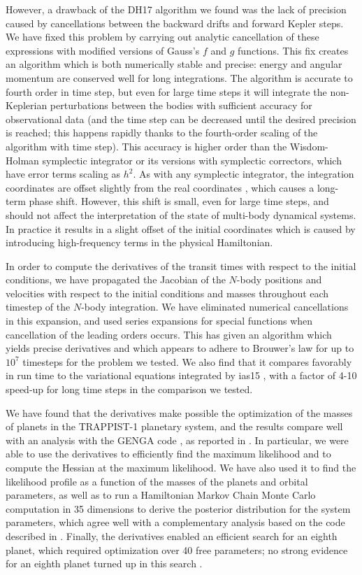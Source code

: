 \documentclass[fleqn,usenatbib,twocolumn]{mnras}
\begin{document}
However, a drawback of the DH17 algorithm we found was the lack of precision caused by cancellations between the backward drifts and forward Kepler steps.  We have fixed this problem by carrying out analytic cancellation of these expressions with modified versions of Gauss's $f$ and $g$ functions.   This fix creates an algorithm which is both numerically stable and precise:  energy and angular momentum are conserved well for long integrations.  The algorithm is accurate to fourth order in time step, but even for large time steps it will integrate the non-Keplerian perturbations between the bodies with sufficient accuracy for observational data (and the time step can be decreased until the desired precision is reached;  this happens rapidly thanks to the fourth-order scaling of the algorithm with time step).  This accuracy is higher order than the Wisdom-Holman symplectic integrator or its versions with symplectic correctors, which have error terms scaling as $h^2$.  As with any symplectic integrator, the integration coordinates are offset slightly from the real coordinates \citep{Wisdom1996}, which causes a long-term phase shift.  However, this shift is small, even for large time steps, and  should not affect the interpretation of the state of multi-body dynamical systems.  In practice it results in a slight offset of the initial coordinates which is caused by introducing high-frequency terms in the physical Hamiltonian.

In order to compute the derivatives of the transit times with respect to the initial conditions, we have propagated  the Jacobian of the $N$-body positions and velocities  with respect to the initial conditions and masses throughout each  timestep of the $N$-body integration.  We have eliminated numerical cancellations in this expansion, and used series expansions for special functions when cancellation of the leading orders occurs.  This has given an algorithm which yields precise derivatives and which appears to adhere to Brouwer's law for up to $10^7$ timesteps for the problem we tested.  We also find that it compares favorably in run time to the variational equations integrated by {\sc ias15} \citep{Rein2016}, with a factor of 4-10 speed-up for long time steps in the comparison we tested.

We have found that the derivatives make possible the optimization
of the masses of planets in the TRAPPIST-1 planetary system, and the
results compare well with an analysis with the GENGA code \citep{Grimm2014}, as reported in \citet{Agol2021}. In particular,
we were able to use the derivatives to efficiently find the maximum likelihood
and to compute the Hessian at the maximum likelihood.  We have also used it to
find the likelihood profile
as a function of the masses of the planets and orbital parameters, as well as to run a
Hamiltonian Markov Chain Monte Carlo computation in 35 dimensions to derive the posterior
distribution for the system parameters, which agree well
with a complementary analysis based on the code described in \citet{Grimm2018}.  Finally, the derivatives enabled an efficient search for an eighth planet, which required optimization over 40 free parameters;  no strong evidence for an eighth planet turned up in this search \citep{Agol2021}.
\end{document}
